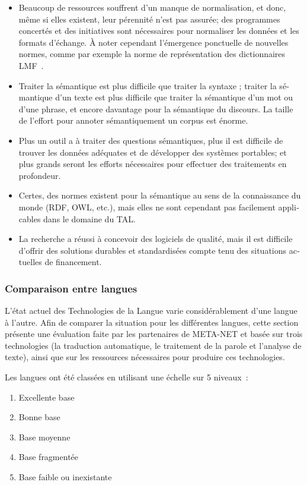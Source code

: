\begin{french}
\begin{multicols}{2}
\begin{itemize}
\item Beaucoup de ressources souffrent d'un manque de normalisation,
  et donc, même si elles existent, leur pérennité n'est pas
  assurée; des programmes concertés et des initiatives sont
  nécessaires pour normaliser les données et les formats d'échange. À noter cependant l'émergence ponctuelle de nouvelles
  normes, comme par exemple la norme de représentation des dictionnaires LMF~\cite{LMF}.

\item Traiter la sémantique est plus difficile que traiter la syntaxe ;
traiter la sémantique d'un texte est plus difficile que traiter la
sémantique d'un mot ou d'une phrase, et encore davantage pour la sémantique
du discours. La taille de l'effort pour annoter sémantiquement un
corpus est énorme.

\item Plus un outil a à traiter des questions sémantiques, plus il est
difficile de trouver les données adéquates et de développer des
systèmes portables; et plus grands seront les efforts nécessaires pour
effectuer des traitements en profondeur.

\item Certes, des normes existent pour la sémantique au sens de la
connaissance du monde (RDF, OWL, etc.), mais elles ne sont cependant
pas facilement applicables dans le domaine du TAL.

\item La recherche a réussi à concevoir des logiciels de qualité, mais il
est difficile d'offrir des solutions durables et standardisées compte
tenu des situations actuelles de financement.
\end{itemize}

\subsubsection{Comparaison entre langues}

L'état actuel des Technologies de la Langue varie considérablement
d'une langue à l'autre. Afin de comparer la situation pour les
différentes langues, cette section présente une évaluation faite par
les partenaires de META-NET et basée sur trois technologies (la
traduction automatique, le traitement de la parole et l'analyse de
texte), ainsi que sur les ressources nécessaires pour produire ces
technologies.

Les langues ont été classées en utilisant une échelle sur 5 niveaux~:
\begin{enumerate}
\item Excellente base
\item Bonne base
\item Base moyenne
\item Base fragmentée
\item Base faible ou inexistante
\end{enumerate}


\end{multicols}
\end{french}
